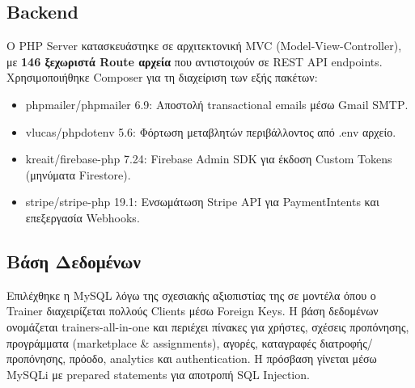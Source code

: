 \documentclass[12pt,a4paper]{report}
\begin{document}
\subsection{Backend}
Ο \textenglish{PHP Server} κατασκευάστηκε σε αρχιτεκτονική \textenglish{MVC (Model-View-Controller)}, με \textbf{146 ξεχωριστά \textenglish{Route} αρχεία} που αντιστοιχούν σε \textenglish{REST API endpoints}. Χρησιμοποιήθηκε \textenglish{Composer} για τη διαχείριση των εξής πακέτων:
\begin{itemize}[label=•]
    \item \textenglish{phpmailer/phpmailer 6.9:} Αποστολή \textenglish{transactional emails} μέσω \textenglish{Gmail SMTP}.
    \item \textenglish{vlucas/phpdotenv 5.6:} Φόρτωση μεταβλητών περιβάλλοντος από \textenglish{.env} αρχείο.
    \item \textenglish{kreait/firebase-php 7.24:} \textenglish{Firebase Admin SDK} για έκδοση \textenglish{Custom Tokens} (μηνύματα \textenglish{Firestore}).
    \item \textenglish{stripe/stripe-php 19.1:} Ενσωμάτωση \textenglish{Stripe API} για \textenglish{PaymentIntents} και επεξεργασία \textenglish{Webhooks}.
\end{itemize}

\subsection{Βάση Δεδομένων}
Επιλέχθηκε η \textenglish{MySQL} λόγω της σχεσιακής αξιοπιστίας της σε μοντέλα όπου ο \textenglish{Trainer} διαχειρίζεται πολλούς \textenglish{Clients} μέσω \textenglish{Foreign Keys}. Η βάση δεδομένων ονομάζεται \textenglish{trainers-all-in-one} και περιέχει πίνακες για χρήστες, σχέσεις προπόνησης, προγράμματα \textenglish{(marketplace \& assignments)}, αγορές, καταγραφές διατροφής/προπόνησης, πρόοδο, \textenglish{analytics} και \textenglish{authentication}. Η πρόσβαση γίνεται μέσω \textenglish{MySQLi} με \textenglish{prepared statements} για αποτροπή \textenglish{SQL Injection}.
\end{document}

